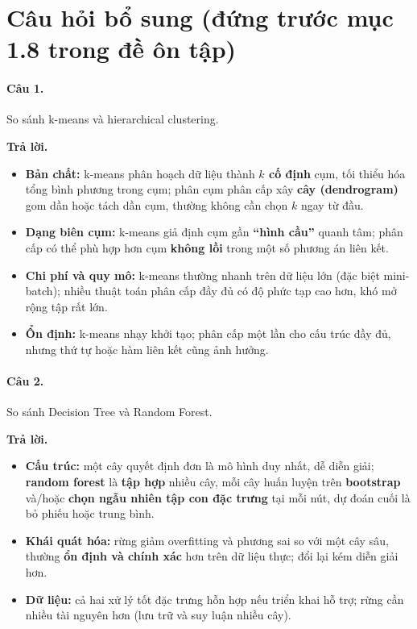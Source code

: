 \section*{Câu hỏi bổ sung (đứng trước mục 1.8 trong đề ôn tập)}

\paragraph{Câu 1.} So sánh k-means và hierarchical clustering.

\medskip\noindent\textbf{Trả lời.}
\begin{itemize}[nosep]
\item \textbf{Bản chất:} k-means phân hoạch dữ liệu thành \textbf{$k$ cố định} cụm, tối thiểu hóa tổng bình phương trong cụm; phân cụm phân cấp xây \textbf{cây (dendrogram)} gom dần hoặc tách dần cụm, thường không cần chọn $k$ ngay từ đầu.
\item \textbf{Dạng biên cụm:} k-means giả định cụm gần \textbf{``hình cầu''} quanh tâm; phân cấp có thể phù hợp hơn cụm \textbf{không lồi} trong một số phương án liên kết.
\item \textbf{Chi phí và quy mô:} k-means thường nhanh trên dữ liệu lớn (đặc biệt mini-batch); nhiều thuật toán phân cấp đầy đủ có độ phức tạp cao hơn, khó mở rộng tập rất lớn.
\item \textbf{Ổn định:} k-means nhạy khởi tạo; phân cấp một lần cho cấu trúc đầy đủ, nhưng thứ tự hoặc hàm liên kết cũng ảnh hưởng.
\end{itemize}

\paragraph{Câu 2.} So sánh Decision Tree và Random Forest.

\medskip\noindent\textbf{Trả lời.}
\begin{itemize}[nosep]
\item \textbf{Cấu trúc:} một cây quyết định đơn là mô hình duy nhất, dễ diễn giải; \textbf{random forest} là \textbf{tập hợp} nhiều cây, mỗi cây huấn luyện trên \textbf{bootstrap} và/hoặc \textbf{chọn ngẫu nhiên tập con đặc trưng} tại mỗi nút, dự đoán cuối là bỏ phiếu hoặc trung bình.
\item \textbf{Khái quát hóa:} rừng giảm overfitting và phương sai so với một cây sâu, thường \textbf{ổn định và chính xác} hơn trên dữ liệu thực; đổi lại kém diễn giải hơn.
\item \textbf{Dữ liệu:} cả hai xử lý tốt đặc trưng hỗn hợp nếu triển khai hỗ trợ; rừng cần nhiều tài nguyên hơn (lưu trữ và suy luận nhiều cây).
\end{itemize}


